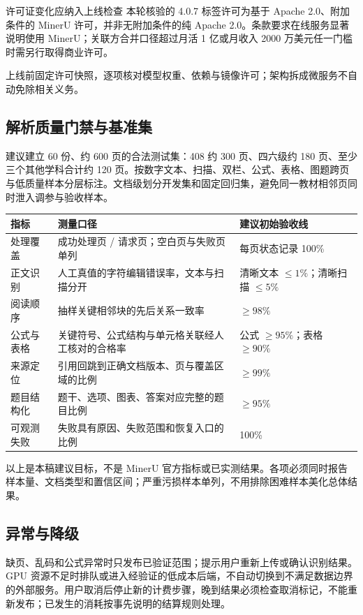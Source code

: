 \documentclass[UTF8,a4paper,11pt,fontset=none]{ctexart}
\newcommand{\cth}[1]{\textbf{\sffamily #1}}
\newcommand{\minor}[1]{{\small\color{Muted}#1}}
\newcommand{\cont}[1]{\clearpage\noindent{\small\sffamily\color{Muted}#1}\par\vspace{3pt}}
\newenvironment{tbl}{\par\vspace{3pt}\small\noindent\ignorespaces}{\unskip\par\vspace{5pt}}
\begin{document}
\begin{caution}{许可证变化应纳入上线检查}
本轮核验的 4.0.7 标签许可为基于 Apache 2.0、附加条件的 MinerU 许可，并非无附加条件的纯 Apache 2.0。条款要求在线服务显著说明使用 MinerU；关联方合并口径超过月活 1 亿或月收入 2000 万美元任一门槛时需另行取得商业许可。\cite{mineru_license} \par
上线前固定许可快照，逐项核对模型权重、依赖与镜像许可；架构拆成微服务不自动免除相关义务。
\end{caution}

\cont{8 / PDF 解析与内容识别（续）}
\subsection{解析质量门禁与基准集}
建议建立 60 份、约 600 页的合法测试集：408 约 300 页、四六级约 180 页、至少三个其他学科合计约 120 页。按数字文本、扫描、双栏、公式、表格、图题跨页与低质量样本分层标注。文档级划分开发集和固定回归集，避免同一教材相邻页同时泄入调参与验收样本。

\begin{tbl}
\begin{tabularx}{\linewidth}{@{}L{30mm}YL{30mm}@{}}
\toprule
\cth{指标}&\cth{测量口径}&\cth{建议初始验收线}\\\midrule
处理覆盖&成功处理页 / 请求页；空白页与失败页单列&每页状态记录 100\%\\
正文识别&人工真值的字符编辑错误率，文本与扫描分开&清晰文本 $\leq1\%$；清晰扫描 $\leq5\%$\\
阅读顺序&抽样关键相邻块的先后关系一致率&$\geq98\%$\\
公式与表格&关键符号、公式结构与单元格关联经人工核对的合格率&公式 $\geq95\%$；表格 $\geq90\%$\\
来源定位&引用回跳到正确文档版本、页与覆盖区域的比例&$\geq99\%$\\
题目结构化&题干、选项、图表、答案对应完整的题目比例&$\geq95\%$\\
可观测失败&失败具有原因、失败范围和恢复入口的比例&100\%\\
\bottomrule
\end{tabularx}
\end{tbl}
\minor{以上是本稿建议目标，不是 MinerU 官方指标或已实测结果。各项必须同时报告样本量、文档类型和置信区间；严重污损样本单列，不用排除困难样本美化总体结果。}

\subsection{异常与降级}
缺页、乱码和公式异常时只发布已验证范围；提示用户重新上传或确认识别结果。GPU 资源不足时排队或进入经验证的低成本后端，不自动切换到不满足数据边界的外部服务。用户取消后停止新的计费步骤，晚到结果必须检查取消标记，不能重新发布；已发生的消耗按事先说明的结算规则处理。
\end{document}
